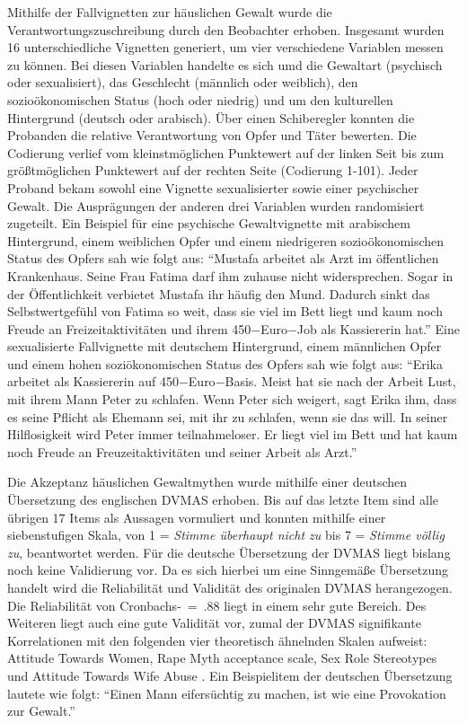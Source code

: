 Mithilfe der Fallvignetten zur häuslichen Gewalt wurde die Verantwortungszuschreibung durch den Beobachter erhoben. Insgesamt wurden 16 unterschiedliche Vignetten generiert, um vier verschiedene Variablen messen zu können. Bei diesen Variablen handelte es sich umd die Gewaltart (psychisch oder sexualisiert), das Geschlecht (männlich oder weiblich), den sozioökonomischen Status (hoch oder niedrig) und um den kulturellen Hintergrund (deutsch oder arabisch). Über einen Schiberegler konnten die Probanden die relative Verantwortung von Opfer und Täter bewerten. Die Codierung verlief vom kleinstmöglichen Punktewert auf der linken Seit bis zum größtmöglichen Punktewert auf der rechten Seite (Codierung 1-101). Jeder Proband bekam sowohl eine Vignette sexualisierter sowie einer psychischer Gewalt. Die Ausprägungen der anderen drei Variablen wurden randomisiert zugeteilt.
Ein Beispiel für eine psychische Gewaltvignette mit arabischem Hintergrund, einem weiblichen Opfer und einem niedrigeren sozioökonomischen Status des Opfers sah wie folgt aus: \enquote{Mustafa arbeitet als Arzt im öffentlichen Krankenhaus. Seine Frau Fatima darf ihm zuhause nicht widersprechen. Sogar in der Öffentlichkeit verbietet Mustafa ihr häufig den Mund. Dadurch sinkt das Selbstwertgefühl von Fatima so weit, dass sie viel im Bett liegt und kaum noch Freude an Freizeitaktivitäten und ihrem 450$-$Euro$-$Job als Kassiererin hat.} 
Eine sexualisierte Fallvignette mit deutschem Hintergrund, einem männlichen Opfer und einem hohen soziökonomischen Status des Opfers sah wie folgt aus: \enquote{Erika arbeitet als Kassiererin auf 450$-$Euro$-$Basis. Meist hat sie nach der Arbeit Lust, mit ihrem Mann Peter zu schlafen. Wenn Peter sich weigert, sagt Erika ihm, dass es seine Pflicht als Ehemann sei, mit ihr zu schlafen, wenn sie das will. In seiner Hilflosigkeit wird Peter immer teilnahmeloser. Er liegt viel im Bett und hat kaum noch Freude an Freuzeitaktivitäten und seiner Arbeit als Arzt.}

Die Akzeptanz häuslichen Gewaltmythen wurde mithilfe einer deutschen Übersetzung des englischen DVMAS \parencite{Peters2003} erhoben. Bis auf das letzte Item sind alle übrigen 17 Items als Aussagen vormuliert und konnten mithilfe einer siebenstufigen Skala, von 1 = \textit{Stimme überhaupt nicht zu} bis 7 = \textit{Stimme völlig zu}, beantwortet werden. 
Für die deutsche Übersetzung der DVMAS liegt bislang noch keine Validierung vor. Da es sich hierbei um eine Sinngemäße Übersetzung handelt wird die Reliabilität und Validität des originalen DVMAS herangezogen. Die Reliabilität von Cronbachs-\textalpha~=~.88 liegt in einem sehr gute Bereich. Des Weiteren liegt auch eine gute Validität vor, zumal der DVMAS signifikante Korrelationen mit den folgenden vier theoretisch ähnelnden Skalen aufweist: Attitude Towards Women, Rape Myth acceptance scale, Sex Role Stereotypes und Attitude Towards Wife Abuse \parencite{DVMAS_Peters}.
Ein Beispielitem der deutschen Übersetzung lautete wie folgt: \enquote{Einen Mann eifersüchtig zu machen, ist wie eine Provokation zur Gewalt.}

